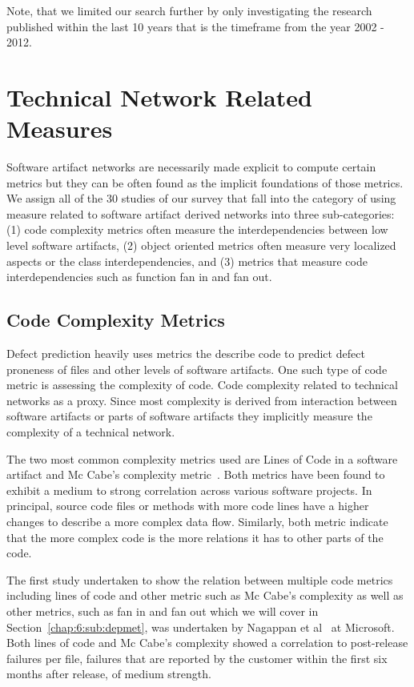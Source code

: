 Note, that we limited our search further by only investigating the research published within the last 10 years that is the timeframe from the year 2002 - 2012.

\section{Technical Network Related Measures}
\label{chap:6:measure}
Software artifact networks are necessarily made explicit to compute certain metrics but they can be often found as the implicit foundations of those metrics.
We assign all of the 30 studies of our survey that fall into the category of using measure related to software artifact derived networks into three sub-categories:
(1) code complexity metrics often measure the interdependencies between low level software artifacts,
(2) object oriented metrics often measure very localized aspects or the class interdependencies,
and (3) metrics that measure code interdependencies such as function fan in and fan out.

\subsection{Code Complexity Metrics}
Defect prediction heavily uses metrics the describe code to predict defect proneness of files and other levels of software artifacts.
One such type of code metric is assessing the complexity of code.
Code complexity related to technical networks as a proxy.
Since most complexity is derived from interaction between software artifacts or parts of software artifacts they implicitly measure the complexity of a technical network.

The two most common complexity metrics used are Lines of Code in a software artifact and Mc Cabe's complexity metric~\cite{mccabe:ieee:1976}.
Both metrics have been found to exhibit a medium to strong correlation across various software projects.
In principal, source code files or methods with more code lines have a higher changes to describe a more complex data flow.
Similarly, both metric indicate that the more complex code is the more relations it has to other parts of the code.

The first study undertaken to show the relation between multiple code metrics including lines of code and other metric such as Mc Cabe's complexity as well as other metrics, such as fan in and fan out which we will cover in Section~\ref{chap:6:sub:depmet}, was undertaken by Nagappan et al~\cite{nagappan:icse:2006} at Microsoft.
Both lines of code and Mc Cabe's complexity showed a correlation to post-release failures per file, failures that are reported by the customer within the first six months after release, of medium strength.

